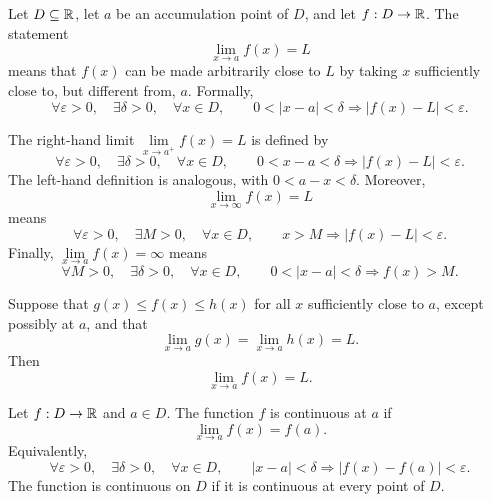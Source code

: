     \begin{definition}
        Let $D\subseteq\mathbb{R}$, let $a$ be an accumulation point of $D$, and let
        $f:D\to\mathbb{R}$. The statement
        \[
            \lim\limits_{x\to a}f(x)=L
        \]
        means that $f(x)$ can be made arbitrarily close to $L$ by taking $x$
        sufficiently close to, but different from, $a$. Formally,
        \[
            \forall\varepsilon>0,
            \quad
            \exists\delta>0,
            \quad
            \forall x\in D,
            \qquad
            0<|x-a|<\delta
            \Rightarrow
            |f(x)-L|<\varepsilon.
        \]
    \end{definition}

    \begin{definition}
        The right-hand limit $\lim\limits_{x\to a^+}f(x)=L$ is defined by
        \[
            \forall\varepsilon>0,
            \quad
            \exists\delta>0,
            \quad
            \forall x\in D,
            \qquad
            0<x-a<\delta
            \Rightarrow
            |f(x)-L|<\varepsilon.
        \]
        The left-hand definition is analogous, with $0<a-x<\delta$.
        Moreover,
        \[
            \lim\limits_{x\to\infty}f(x)=L
        \]
        means
        \[
            \forall\varepsilon>0,
            \quad
            \exists M>0,
            \quad
            \forall x\in D,
            \qquad
            x>M\Rightarrow |f(x)-L|<\varepsilon.
        \]
        Finally, $\lim\limits_{x\to a}f(x)=\infty$ means
        \[
            \forall M>0,
            \quad
            \exists\delta>0,
            \quad
            \forall x\in D,
            \qquad
            0<|x-a|<\delta\Rightarrow f(x)>M.
        \]
    \end{definition}

    \begin{theorem}
        Suppose that $g(x)\leq f(x)\leq h(x)$ for all $x$ sufficiently close
        to $a$, except possibly at $a$, and that
        \[
            \lim\limits_{x\to a}g(x)
            =
            \lim\limits_{x\to a}h(x)
            =L.
        \]
        Then
        \[
            \lim\limits_{x\to a}f(x)=L.
        \]
    \end{theorem}

    \begin{definition}
        Let $f:D\to\mathbb{R}$ and $a\in D$. The function $f$ is continuous at $a$ if
        \[
            \lim\limits_{x\to a}f(x)=f(a).
        \]
        Equivalently,
        \[
            \forall\varepsilon>0,
            \quad
            \exists\delta>0,
            \quad
            \forall x\in D,
            \qquad
            |x-a|<\delta
            \Rightarrow
            |f(x)-f(a)|<\varepsilon.
        \]
        The function is continuous on $D$ if it is continuous at every point of
        $D$.
    \end{definition}

